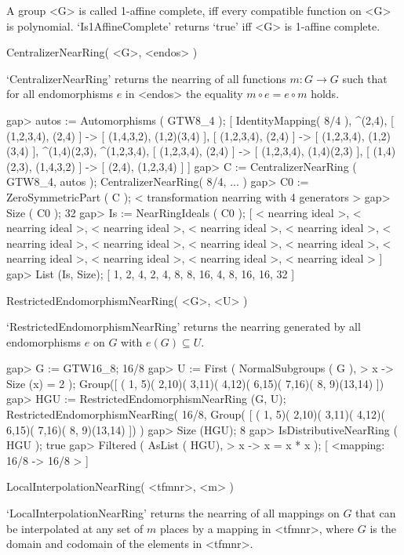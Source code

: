 A group <G> is called 1-affine complete, iff every compatible function on <G> is
polynomial. `Is1AffineComplete' returns `true' iff <G> is 1-affine complete.

\>CentralizerNearRing( <G>, <endos> )

`CentralizerNearRing' returns the nearring of all functions
$m:G \rightarrow G$ such that for all endomorphisms $e$ in <endos> the
equality $m \circ e = e \circ m$ holds.

\beginexample
    gap> autos := Automorphisms ( GTW8_4 );
    [ IdentityMapping( 8/4 ), ^(2,4),
      [ (1,2,3,4), (2,4) ] -> [ (1,4,3,2), (1,2)(3,4) ],
      [ (1,2,3,4), (2,4) ] -> [ (1,2,3,4), (1,2)(3,4) ], ^(1,4)(2,3),
      ^(1,2,3,4), [ (1,2,3,4), (2,4) ] -> [ (1,2,3,4), (1,4)(2,3) ],
      [ (1,4)(2,3), (1,4,3,2) ] -> [ (2,4), (1,2,3,4) ] ]
    gap> C := CentralizerNearRing ( GTW8_4, autos );
    CentralizerNearRing( 8/4, ... )
    gap> C0 := ZeroSymmetricPart ( C );
    < transformation nearring with 4 generators >
    gap> Size ( C0 );
    32
    gap> Is := NearRingIdeals ( C0 );
    [ < nearring ideal >, < nearring ideal >, < nearring ideal >,
      < nearring ideal >, < nearring ideal >, < nearring ideal >,
      < nearring ideal >, < nearring ideal >, < nearring ideal >,
      < nearring ideal >, < nearring ideal >, < nearring ideal >,
      < nearring ideal > ]
    gap> List (Is, Size);
    [ 1, 2, 4, 2, 4, 8, 8, 16, 4, 8, 16, 16, 32 ]
\endexample

\>RestrictedEndomorphismNearRing( <G>, <U> )

`RestrictedEndomorphismNearRing' returns the nearring generated by all
endomorphisms $e$ on $G$ with $e(G) \subseteq U$.

\beginexample
    gap> G := GTW16_8;
    16/8
    gap> U := First ( NormalSubgroups ( G ),
    >              x -> Size (x) = 2 );
    Group([ ( 1, 5)( 2,10)( 3,11)( 4,12)( 6,15)( 7,16)( 8, 9)(13,14) ])
    gap> HGU := RestrictedEndomorphismNearRing (G, U);
    RestrictedEndomorphismNearRing( 16/8, Group(
    [ ( 1, 5)( 2,10)( 3,11)( 4,12)( 6,15)( 7,16)( 8, 9)(13,14) ]) )
    gap> Size (HGU);
    8
    gap> IsDistributiveNearRing ( HGU );
    true
    gap> Filtered ( AsList ( HGU),
    >       x -> x = x * x );
    [ <mapping: 16/8 -> 16/8 > ]
\endexample
 
\>LocalInterpolationNearRing( <tfmnr>, <m> )

`LocalInterpolationNearRing' returns the nearring of all mappings on
$G$ that can be interpolated at any set of $m$ places by a mapping in
<tfmnr>, where $G$ is the domain and codomain of the elements in
<tfmnr>.


